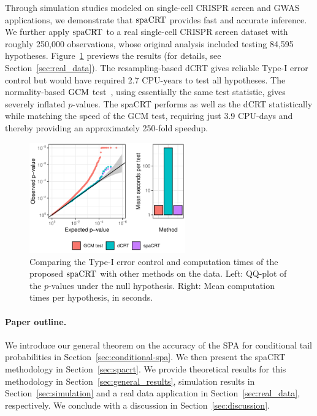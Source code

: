 \documentclass[12pt]{article}
\theoremstyle{definition}
\newcommand{\GCM}{\textnormal{GCM}}						%
\newcommand{\spacrt}{\textnormal{spaCRT}}               %
\begin{document}
  Through simulation studies modeled on single-cell CRISPR screen and GWAS applications, we demonstrate that $\spacrt$ provides fast and accurate inference. We further apply $\spacrt$ to a real single-cell CRISPR screen dataset \citep{Gasperini2019a} with roughly 250,000 observations, whose original analysis included testing 84,595 hypotheses. Figure~\ref{fig:dCRT_GCM_binomial_poisson} previews the results (for details, see Section~\ref{sec:real_data}). The resampling-based dCRT gives reliable Type-I error control but would have required 2.7 CPU-years to test all hypotheses. The normality-based $\GCM$ test~\citep{Shah2018}, using essentially the same test statistic, gives severely inflated $p$-values. The spaCRT performs as well as the dCRT statistically while matching the speed of the GCM test, requiring just 3.9 CPU-days and thereby providing an approximately 250-fold speedup. 

  \begin{figure}[h!]
	  \centering
	  \includegraphics[width=0.6\textwidth]{figures-and-tables/real-data/motivating_example.pdf} 
	  \caption{\small{Comparing the Type-I error control and computation times of the proposed $\spacrt$ with other methods on the \citet{Gasperini2019a} data. Left: QQ-plot of the $p$-values under the null hypothesis. Right: Mean computation times per hypothesis, in seconds.}}
	  \label{fig:dCRT_GCM_binomial_poisson} 
  \end{figure}
  
  \vspace{-0.2in}
  
  \paragraph{Paper outline.}
  
  We introduce our general theorem on the accuracy of the SPA for conditional tail probabilities in Section~\ref{sec:conditional-spa}. We then present the spaCRT methodology in Section~\ref{sec:spacrt}. We provide theoretical results for this methodology in Section~\ref{sec:general_results}, simulation results in Section~\ref{sec:simulation} and a real data application in Section~\ref{sec:real_data}, respectively. We conclude with a discussion in Section~\ref{sec:discussion}. 
  
\end{document}

